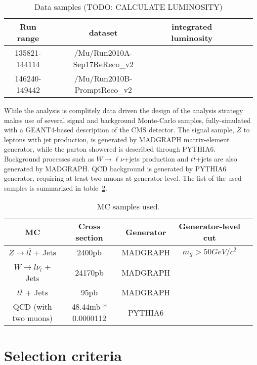 \documentclass{cmspaper}
\begin{document}
\begin{table}[htbp]
   \caption{Data samples (TODO: CALCULATE LUMINOSITY)}
   \centering
   \begin{tabular}{|c|c|c|c|c|c|}
   \hline
   Run range & dataset & integrated luminosity \\\hline
   135821-144114 & /Mu/Run2010A-Sep17ReReco\_v2 &  \\\hline
   146240-149442 & /Mu/Run2010B-PromptReco\_v2 &  \\\hline
   \end{tabular}
   \label{Table_DataSamples}
\end{table}

While the analysis is complitely data driven the design of the
analysis strategy makes use of several signal and background
Monte-Carlo samples, fully-simulated with a GEANT4-based description
of the CMS detector. The signal sample, $Z$ to leptons with jet
production, is generated by MADGRAPH matrix-element generator, while
the parton showered is described through PYTHIA6.  Background
processes such as $W\to \ell \nu$+jets production and $t \bar t$+jets
are also generated by MADGRAPH.  QCD background is generated by
PYTHIA6 generator, requiring at least two muons at generator level.
The list of the used samples is summarized in
table~\ref{Table_MCSamples}.

\begin{table}[htbp]
   \caption{MC samples used.}
   \centering
   \begin{tabular}{|c|c|c|c|c|}
   \hline
   MC & Cross section & Generator & Generator-level cut \\\hline
   $Z \rightarrow l\bar{l}$ + Jets & 2400pb & MADGRAPH & $m_{l\bar{l}} > 50 GeV/c^2$ \\\hline
   $W \rightarrow l\nu_l$ + Jets & 24170pb & MADGRAPH &  \\\hline
   $t\bar{t}$ + Jets & 95pb & MADGRAPH &  \\\hline
   QCD (with two muons) & 48.44mb * 0.0000112 & PYTHIA6 &  \\\hline
   \end{tabular}
   \label{Table_MCSamples}
\end{table}

\section{Selection criteria}

\end{document}
